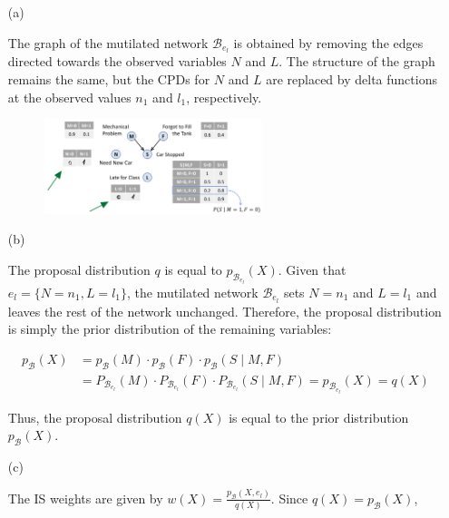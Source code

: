 \documentclass[a4 paper]{article}
\begin{document}
\begin{enumerate}
    \item[(a)] 

    The graph of the mutilated network \( \mathcal{B}_{e_l} \) is obtained by removing the edges directed towards the observed 
    variables \( N \) and \( L \). The structure of the graph remains the same, but the CPDs for \( N \) and \( L \) 
    are replaced by delta functions at the observed values \( n_1 \) and \( l_1 \), respectively.

    
    \begin{figure}[H]
        \centering
        \includegraphics[width=0.6\textwidth]{./plots/12a.jpeg}
    \end{figure}
    
    
    \item[(b)] 
    
    The proposal distribution \( q \) is equal to \( p_{\mathcal{B}_{e_l}}(X) \). Given that \( e_l = \{N = n_1, L = l_1\} \), 
    the mutilated network \( \mathcal{B}_{e_l} \) sets \( N = n_1 \) and \( L = l_1 \) and leaves the rest of the network unchanged. 
    Therefore, the proposal distribution is simply the prior distribution of the remaining variables:

    \begin{align*}
    p_{\mathcal{B}}(X) &= p_{\mathcal{B}}(M) \cdot p_{\mathcal{B}}(F) \cdot p_{\mathcal{B}}(S \mid M, F) \\
    &= P_{\mathcal{B}_{e_l}}(M) \cdot P_{\mathcal{B}_{e_l}}(F) \cdot P_{\mathcal{B}_{e_l}}(S \mid M, F) = p_{\mathcal{B}_{e_l}}(X) = q(X)
    \end{align*}

    Thus, the proposal distribution \( q(X) \) is equal to the prior distribution \( p_{\mathcal{B}}(X) \).

    
    \item[(c)] 
    
    The IS weights are given by \( w(X) = \frac{p_{\mathcal{B}}(X, e_l)}{q(X)} \). Since \( q(X) = p_{\mathcal{B}}(X) \),


\end{enumerate}
\end{document}
